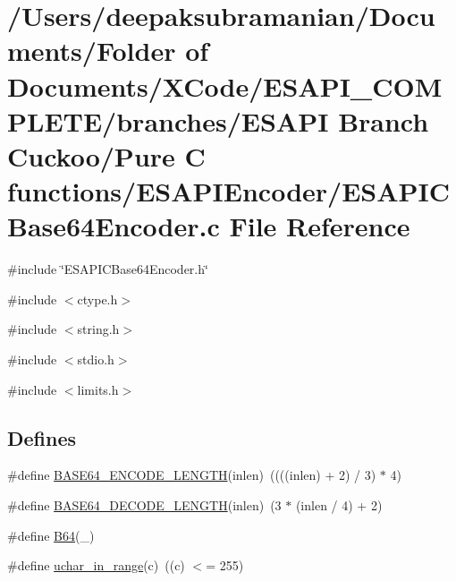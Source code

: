 \hypertarget{a00021}{
\section{/Users/deepaksubramanian/Documents/Folder of Documents/XCode/ESAPI\_\-COMPLETE/branches/ESAPI Branch Cuckoo/Pure C functions/ESAPIEncoder/ESAPICBase64Encoder.c File Reference}
\label{de/d11/a00021}
}
{\ttfamily \#include \char`\"{}ESAPICBase64Encoder.h\char`\"{}}\par
{\ttfamily \#include $<$ctype.h$>$}\par
{\ttfamily \#include $<$string.h$>$}\par
{\ttfamily \#include $<$stdio.h$>$}\par
{\ttfamily \#include $<$limits.h$>$}\par
\subsection*{Defines}
\begin{DoxyCompactItemize}
\item 
\#define \hyperlink{a00021_a8ce971890889c52c3c27cad0e00fd270}{BASE64\_\-ENCODE\_\-LENGTH}(inlen)~((((inlen) + 2) / 3) $\ast$ 4)
\item 
\#define \hyperlink{a00021_a9aa433efacf01c0dc6cea513272a9195}{BASE64\_\-DECODE\_\-LENGTH}(inlen)~(3 $\ast$ (inlen / 4) + 2)
\item 
\#define \hyperlink{a00021_a6efb717563bf5814129fb1058d1dfdb3}{B64}(\_\-)
\item 
\#define \hyperlink{a00021_a12c6c1b0c78f82cbe2ee3508b1c25f37}{uchar\_\-in\_\-range}(c)~((c) $<$= 255)
\end{DoxyCompactItemize}
